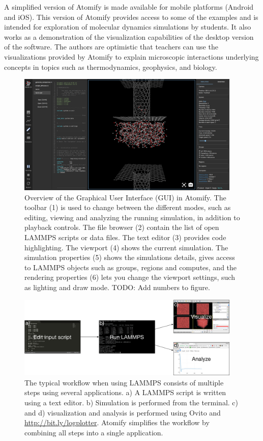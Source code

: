 \documentclass[aps,pre,twocolumn,letterpaper,floatfix,nofootinbib]{revtex4}
\begin{document}
A simplified version of Atomify is made available for mobile platforms (Android
and iOS).
This version of Atomify provides access to some of the examples and is intended
for exploration of molecular dynamics simulations by students.
It also works as a demonstration of the visualization capabilities of the
desktop version of the software.
The authors are optimistic that teachers can use the visualizations provided by
Atomify to explain microscopic interactions underlying concepts in topics such
as thermodynamics, geophysics, and biology.
\begin{figure}
	\centering
	\includegraphics[width=0.95\textwidth]{gui.png}
	\caption{%
    Overview of the Graphical User Interface (GUI) in Atomify.
    The toolbar (1) is used to change between the different modes, such as 
    editing, viewing and analyzing the running simulation, 
    in addition to playback controls.
    The file browser (2) contain the list of open LAMMPS scripts or data files.
    The text editor (3) provides code highlighting.
    The viewport (4) shows the current simulation.
    The simulation properties (5) shows the simulations details, gives access to 
    LAMMPS objects such as groups, regions and computes, and the rendering
    properties (6) lets you change the viewport settings, such as lighting and
    draw mode.
    TODO: Add numbers to figure.
    }
	\label{fig:gui}
\end{figure}

\begin{figure}
	\centering
	\includegraphics[width=0.95\textwidth]{flowchart.png}
	\caption{The typical workflow when using LAMMPS consists of multiple steps using several applications. a) A LAMMPS script is written using a text editor. b) Simulation is performed from the terminal. c) and d) visualization and analysis is performed using Ovito and \url{http://bit.ly/logplotter}. Atomify simplifies the workflow by combining all steps into a single application. }
	\label{fig:flowchart}
\end{figure}
\end{document}
